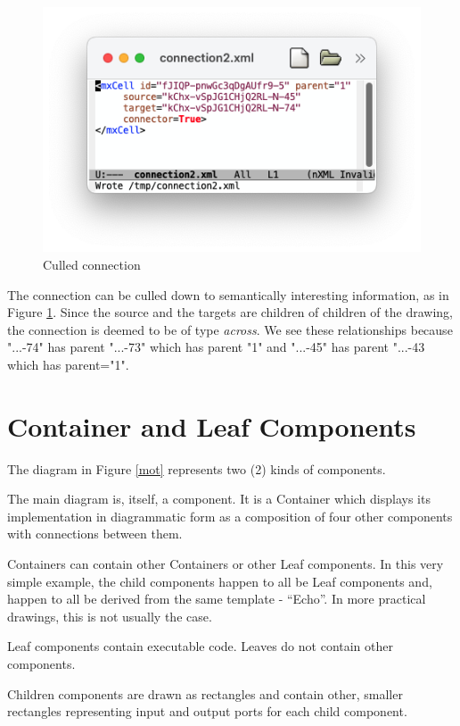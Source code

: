 \documentclass[10pt,anonymous,review]{acmart}
\begin{document}
\begin{figure}
    \includegraphics[trim=1cm 1.9cm 1cm 1cm, clip, scale=0.4]{./media/connection2.png}
    \caption{Culled connection}
    \label{connection2}
\end{figure}
The connection can be culled down to semantically interesting information, as in Figure \ref{connection2}.
Since the source and the targets are children of children of the drawing, the connection is deemed to be of type \emph{across}.
We see these relationships because "...-74" has parent "...-73" which has parent "1" and "...-45" has parent "...-43 which has parent="1". 
\vspace{1\baselineskip}


\section{Container and Leaf Components} \label{containerleaf}
The diagram in Figure \ref{mot} represents two (2) kinds of components.

The main diagram is, itself, a component. It is a Container which displays its implementation in diagrammatic form as a composition of four other components with connections between them.

Containers can contain other Containers or other Leaf components. In this very simple example, the child components happen to all be Leaf components and, happen to all be derived from the same template - “Echo”. In more practical drawings, this is not usually the case.

Leaf components contain executable code. Leaves do not contain other components.

Children components are drawn as rectangles and contain other, smaller rectangles representing input and output ports for each child component.
\end{document}
